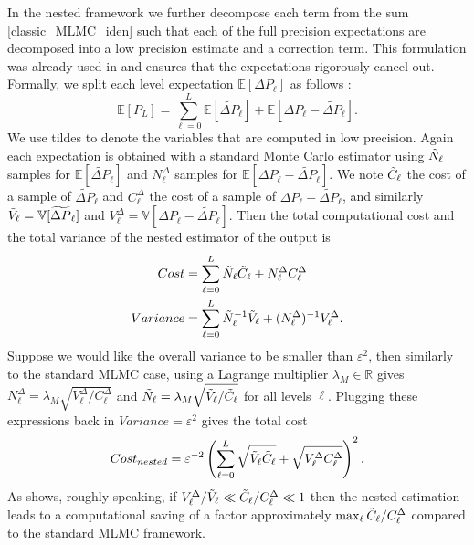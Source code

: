 In the nested framework we further decompose each term from the sum \eqref{classic_MLMC_iden} such that each of the full precision expectations are decomposed into a low precision estimate and a correction term. This formulation was already used in \cite{NestedOliver} and ensures that the expectations rigorously cancel out.
Formally, we split each level expectation $\mathbb{E}[\Delta P_\ell]$ as follows :
\begin{equation} \label{chap:nested_exp}
    \mathbb{E}[P_L] = \sum_{\ell=0}^L  \mathbb{E}[\widetilde{\Delta P}_\ell] + \mathbb{E}[\Delta P_\ell - \widetilde{\Delta P}_\ell].
\end{equation}
We use tildes to denote the variables that are computed in low precision.
Again each expectation is obtained with a standard Monte Carlo estimator using $\Tilde{N}_\ell$ samples for $\mathbb{E}[\widetilde{\Delta P}_\ell]$ and $N^{\Delta}_\ell$ samples for $\mathbb{E}[\Delta P_\ell - \widetilde{\Delta P}_\ell]$. We note $\Tilde{C}_\ell$ the cost of a sample of $\widetilde{\Delta P}_\ell$ and $C^{\Delta}_\ell$ the cost of a sample of $\Delta P_\ell - \widetilde{\Delta P}_\ell$, and similarly $\Tilde{V}_\ell = \mathbb{V}[\widetilde{\Delta P}_\ell]$ and $V^{\Delta}_\ell = \mathbb{V}[\Delta P_\ell-\widetilde{\Delta P}_\ell]$.
Then the total computational cost and the total variance of the nested estimator of the output is
\begin{align}
    Cost &= \sum_{\ell=0}^L \Tilde{N}_\ell \Tilde{C}_\ell + N^{\Delta}_\ell C^{\Delta}_\ell \label{eq:cost_nested}\\
    Variance &= \sum_{\ell=0}^L \Tilde{N}_\ell^{-1} \Tilde{V}_\ell + (N^{\Delta}_\ell)^{-1} V^{\Delta}_\ell. \label{eq:var_nested}
\end{align}
Suppose we would like the overall variance to be smaller than $\varepsilon^2$, then similarly to the standard MLMC case, using a Lagrange multiplier $\lambda_M \in \mathbb{R}$ gives $N^{\Delta}_\ell = \lambda_M \sqrt{V^{\Delta}_\ell/C^{\Delta}_\ell}$ and $ \Tilde{N}_\ell = \lambda_M \sqrt{\Tilde{V}_\ell/\Tilde{C}_\ell}$ for all levels $\ell$. Plugging these expressions back in $Variance = \varepsilon^2$ gives the total cost
\begin{equation}
    Cost_{nested} = \varepsilon^{-2} \left( \sum_{\ell=0}^L \sqrt{\Tilde{V}_\ell\Tilde{C}_\ell}+\sqrt{V^{\Delta}_\ell C^{\Delta}_\ell} \right)^2.
\end{equation}
As \cite{NestedOliver} shows, roughly speaking, if $V^{\Delta}_\ell/\Tilde{V}_\ell \ll \Tilde{C}_\ell/C^{\Delta}_\ell \ll 1$ then the nested estimation leads to a computational saving of a factor approximately $\max_\ell \Tilde{C}_\ell / C^{\Delta}_\ell$ compared to the standard MLMC framework. 


